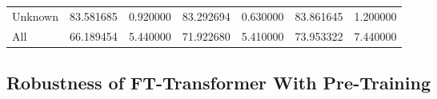 \begin{table}[!ht]
\begin{tabular}{lSSSSSS@{}}
        \tabindent  Unknown          & 83.581685                                      & 0.920000                                    & 83.292694                                     & 0.630000  & 83.861645    & 1.200000  \\
        \cmidrule(rl){1-7}
        All                          & 66.189454                                      & 5.440000                                    & 71.922680                                     & 5.410000  & 73.953322    & 7.440000  \\
        \bottomrule
    \end{tabular}
\end{table}

\newpage
\subsection{Robustness of FT-Transformer With Pre-Training}
\label{app:robustness-of-ft-transformer-with-pre-training}
